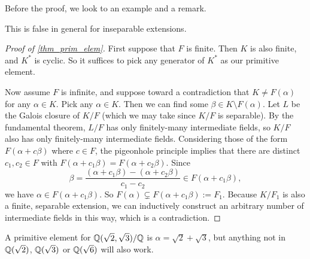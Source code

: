 Before the proof, we look to an example and a remark.

\begin{remark}
    This is false in general for inseparable extensions.
\end{remark}

\begin{proof}[Proof of \cref{thm_prim_elem}]
    First suppose that $F$ is finite. Then $K$ is also finite, and $K^*$ is cyclic. So it suffices to pick any generator of $K^*$ as our primitive element.
    
    Now assume $F$ is infinite, and suppose toward a contradiction that $K \neq F(\alpha)$ for any $\alpha \in K$. Pick any $\alpha \in K$. Then we can find some $\beta \in K \setminus F(\alpha)$. Let $L$ be the Galois closure of $K/F$ (which we may take since $K/F$ is separable). By the fundamental theorem, $L/F$ has only finitely-many intermediate fields, so $K/F$ also has only finitely-many intermediate fields. Considering those of the form $F(\alpha + c\beta)$ where $c \in F$, the pigeonhole principle implies that there are distinct $c_1, c_2 \in F$ with $F(\alpha + c_1\beta) = F(\alpha + c_2\beta)$. Since
    \[
        \beta = \frac{(\alpha + c_1 \beta) - (\alpha + c_2 \beta)}{c_1 - c_2} \in F(\alpha + c_1 \beta),
    \]
    we have $\alpha \in F(\alpha + c_1 \beta)$. So $F(\alpha) \subsetneq F(\alpha + c_1 \beta) := F_1$. Because $K/F_1$ is also a finite, separable extension, we can inductively construct an arbitrary number of intermediate fields in this way, which is a contradiction.
\end{proof}

\begin{example}
    A primitive element for $\mathbb{{Q}}(\sqrt{2}, \sqrt{3})/\mathbb{{Q}}$ is $\alpha = \sqrt{2} + \sqrt{3}$, but anything not in $\mathbb{{Q}}(\sqrt{2})$, $\mathbb{{Q}}(\sqrt{3})$ or $\mathbb{{Q}}(\sqrt{6})$ will also work.
\end{example}
